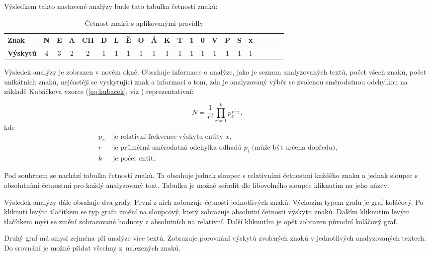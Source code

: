 \documentclass[dp.tex]{subfiles}
\begin{document}
Výsledkem takto nastavené analýzy bude tato tabulka četnosti znaků:

\begin{table}[H]
\caption {Četnost znaků s aplikovanými pravidly} 
\label{tab:title} 
\centering
	\begin{tabular}{|l|c|c|c|c|c|c|c|c|c|c|c|c|c|c|c|c|c|c|c|c|c|}


	\hline \textbf{Znak} & N & E & A & CH & D & L & Ě & O & Á & K & T & 1 & 0 & V & P & S & x \\
	\hline \textbf{Výskytů} & 4 & 3 & 2 & 2 & 1 & 1 & 1 & 1 & 1 & 1 & 1 & 1 & 1 & 1 & 1 & 1 & 1 \\ 
	\hline 
	\end{tabular} 
\end{table} 

Výsledek analýzy je zobrazen v novém okně. Obsahuje informace o analýze, jako je seznam analyzovaných textů, počet všech znaků, počet unikátních znaků, nejčastěji se vyskytující znak a informaci o tom, zda je analyzovaný výběr se zvolenou směrodatnou odchylkou na základě Kubáčkova vzorce (\ref{eq:kubacek}, viz \cite[str.~22]{Wimmer2003}) reprezentativní:

\begin{equation}
\label{eq:kubacek}
N = \frac{1}{r^2} \prod_{x=1}^{k} p_x^{\frac{1}{k-1}},
\end{equation}
kde 
\begin{align*}
      p_x & \text{ je relativní frekvence výskytu entity $x$,}\\
      r   & \text{ je průměrná směrodatná odchylka odhadů $p_i$ (může být určena dopředu),}\\
      k   & \text{ je počet entit.}
\end{align*}   

Pod souhrnem se nachází tabulka četností znaků. Ta obsahuje jednak sloupec s relativními četnostmi každého znaku a jednak sloupec s absolutními četnostmi pro každý analyzovaný text. Tabulku je možné seřadit dle libovolného sloupce kliknutím na jeho název.

Výsledek analýzy dále obsahuje dva grafy. První z nich zobrazuje četnosti jednotlivých znaků. Výchozím typem grafu je graf koláčový. Po kliknutí levým tlačítkem se typ grafu změní na sloupcový, který zobrazuje absolutní četnosti výskytu znaků. Dalším kliknutím levým tlačítkem myši se změní zobrazované hodnoty z absolutních na relativní. Další kliknutím je opět zobrazen původní koláčový graf.

Druhý graf má smysl zejména při analýze více textů. Zobrazuje porovnání výskytů zvolených znaků v jednotlivých analyzovaných textech. Do srovnání je možné přidat všechny z~nalezených znaků.
\end{document}
